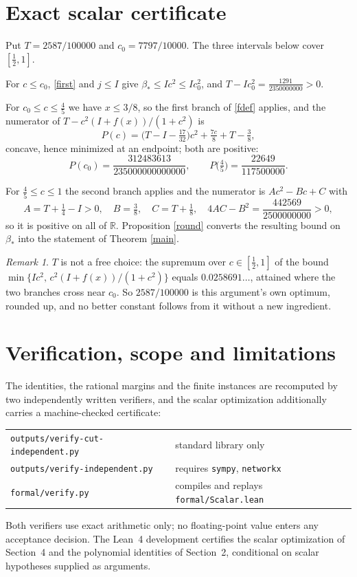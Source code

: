 \documentclass[11pt]{article}
\theoremstyle{remark}
\newtheorem{remark}[theorem]{Remark}
\newcommand{\bh}{\beta_*}
\begin{document}
\section{Exact scalar certificate}
Put $T=2587/100000$ and $c_0=7797/10000$. The three intervals below cover
$[\frac12,1]$.

For $c\le c_0$, \eqref{first} and $j\le I$ give
$\bh\le Ic^2\le Ic_0^2$, and
$T-Ic_0^2=\frac{1291}{2350000000}>0$.

For $c_0\le c\le\frac45$ we have $x\le3/8$, so the first branch of
\eqref{fdef} applies, and the numerator of $T-c^2(I+f(x))/(1+c^2)$ is
\[
 P(c)=\Big(T-I-\tfrac{17}{32}\Big)c^2+\tfrac{7c}{8}+T-\tfrac38 ,
\]
concave, hence minimized at an endpoint; both are positive:
\[
 P(c_0)=\frac{312483613}{235000000000000},\qquad
 P\big(\tfrac45\big)=\frac{22649}{117500000}.
\]

For $\frac45\le c\le1$ the second branch applies and the numerator is
$Ac^2-Bc+C$ with
\[
 A=T+\tfrac14-I>0,\quad B=\tfrac38,\quad C=T+\tfrac18,\quad
 4AC-B^2=\frac{442569}{2500000000}>0,
\]
so it is positive on all of $\mathbb R$. Proposition \ref{round} converts the
resulting bound on $\bh$ into the statement of Theorem \ref{main}.

\begin{remark}
$T$ is not a free choice: the supremum over $c\in[\frac12,1]$ of the bound
$\min\{Ic^2,\,c^2(I+f(x))/(1+c^2)\}$ equals $0.0258691\ldots$, attained where
the two branches cross near $c_0$. So $2587/100000$ is this argument's own
optimum, rounded up, and no better constant follows from it without a new
ingredient.
\end{remark}

\section{Verification, scope and limitations}
The identities, the rational margins and the finite instances are recomputed by
two independently written verifiers, and the scalar optimization additionally
carries a machine-checked certificate:
\begin{center}
\begin{tabular}{@{}ll@{}}
\texttt{outputs/verify-cut-independent.py} & standard library only\\
\texttt{outputs/verify-independent.py}     & requires \texttt{sympy}, \texttt{networkx}\\
\texttt{formal/verify.py}                  & compiles and replays \texttt{formal/Scalar.lean}
\end{tabular}
\end{center}
\noindent Both verifiers use exact arithmetic only; no floating-point value
enters any acceptance decision. The Lean~4 development certifies the scalar
optimization of Section~4 and the polynomial identities of Section~2,
conditional on scalar hypotheses supplied as arguments.
\end{document}
